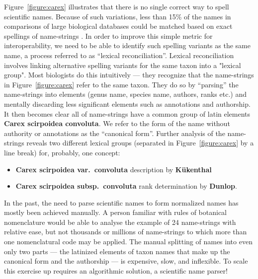 \documentclass{bmcart}
\begin{document}
Figure~\ref{figure:carex} illustrates that there is no single correct way to spell scientific names. Because of such variations, less than 15\% of the names in comparisons of large biological databases could be matched based on exact spellings of name-strings \cite{Patterson2016}. In order to improve this simple metric for interoperability, we need to be able to identify such spelling variants as the same name, a process referred to as ``lexical reconciliation''.  Lexical reconciliation involves linking alternative spelling variants for the same taxon into a "lexical group". Most biologists do this intuitively --- they recognize that the name-strings in Figure~\ref{figure:carex} refer to the same taxon. They do so by ``parsing'' the name-strings into elements (genus name, species name, authors, ranks etc.) and mentally discarding less significant elements such as annotations and authorship. It then becomes clear all of name-strings have a common group of latin elements  \textbf{Carex scirpoidea convoluta}. We refer to the form of the name without authority or annotations as the ``canonical form''. Further analysis of the name-strings  reveals two different lexical groups (separated in Figure~\ref{figure:carex} by a line break) for, probably, one concept:

\begin{itemize}

  \item \textbf{Carex scirpoidea var.\ convoluta} description by
    \textbf{Kükenthal}

  \item \textbf{Carex scirpoidea subsp.\ convoluta} rank determination by
    \textbf{Dunlop}.

\end{itemize}

In the past, the need to parse scientific names to form normalized names has mostly been achieved manually. A person familiar with rules of botanical nomenclature would be able to analyse the example of 24 name-strings with relative ease, but not thousands or millions of name-strings to which more than one nomenclatural code may be applied. The manual splitting of names into even only two parts --- the latinized elements of taxon names that make up the canonical form and the authorship --- is expensive, slow, and inflexible. To scale this exercise up requires an algorithmic solution, a scientific name parser!
\end{document}

